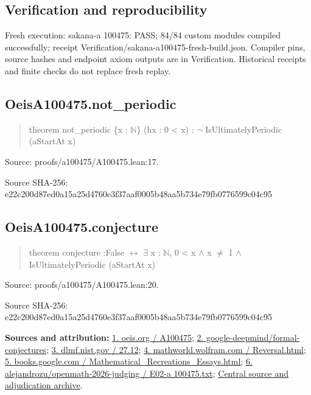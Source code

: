 \documentclass[11pt,a4paper]{article}
\begin{document}
\subsection{Verification and reproducibility}
Fresh execution: sakana-a 100475: PASS; 84/84 custom modules compiled successfully; receipt Verification/sakana-a100475-fresh-build.json. Compiler pins, source hashes and endpoint axiom outputs are in Verification. Historical receipts and finite checks do not replace fresh replay.

\begin{samepage}
\subsection{OeisA100475.not\_periodic}
\begin{quote}\small\ttfamily theorem not\_periodic \{x : \ensuremath{\mathbb{N}}\} (hx : 0 < x) : \ensuremath{\neg} IsUltimatelyPeriodic (aStartAt x)\end{quote}
{\small Source: proofs/a100475/A100475.lean:17.\par}

{\small Source SHA-256: e22c200d87ed0a15a25d4760e3f37aaf0005b48aa5b734e79fb0776599c04c95\par}

\end{samepage}
\begin{samepage}
\subsection{OeisA100475.conjecture}
\begin{quote}\small\ttfamily theorem conjecture :\newline     False \ensuremath{\leftrightarrow} \ensuremath{\exists} x : \ensuremath{\mathbb{N}}, 0 < x \ensuremath{\wedge} x \ensuremath{\neq} 1 \ensuremath{\wedge} IsUltimatelyPeriodic (aStartAt x)\end{quote}
{\small Source: proofs/a100475/A100475.lean:20.\par}

{\small Source SHA-256: e22c200d87ed0a15a25d4760e3f37aaf0005b48aa5b734e79fb0776599c04c95\par}

{\small\textbf{Sources and attribution:} \href{https://oeis.org/A100475}{1. oeis.org / A100475}; \href{https://github.com/google-deepmind/formal-conjectures/pull/5567}{2. google-deepmind/formal-conjectures}; \href{https://dlmf.nist.gov/27.12\#E2}{3. dlmf.nist.gov / 27.12}; \href{https://mathworld.wolfram.com/Reversal.html}{4. mathworld.wolfram.com / Reversal.html}; \href{https://books.google.com/books/about/Mathematical_Recreations_Essays.html?id=9lJqNJhYc9oC}{5. books.google.com / Mathematical\_Recreations\_Essays.html}; \href{https://github.com/alejandrozu/openmath-2026-judging/blob/d0ed487f487fa7ec814ff705ab55249983fe8707/OpenMath-Judging/review/entries/E02-a100475.txt}{6. alejandrozu/openmath-2026-judging / E02-a 100475.txt}; \href{https://github.com/alejandrozu/openmath-2026-judging}{Central source and adjudication archive}.\par}

\end{samepage}
\end{document}

